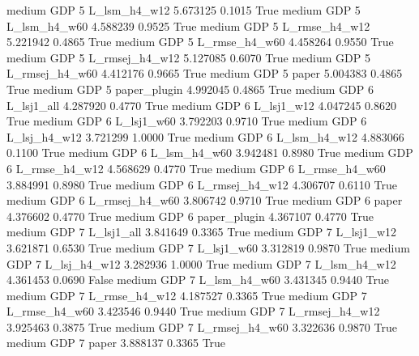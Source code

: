     medium      GDP                 5   L_lsm_h4_w12   5.673125      0.1015    True
    medium      GDP                 5   L_lsm_h4_w60   4.588239      0.9525    True
    medium      GDP                 5  L_rmse_h4_w12   5.221942      0.4865    True
    medium      GDP                 5  L_rmse_h4_w60   4.458264      0.9550    True
    medium      GDP                 5 L_rmsej_h4_w12   5.127085      0.6070    True
    medium      GDP                 5 L_rmsej_h4_w60   4.412176      0.9665    True
    medium      GDP                 5          paper   5.004383      0.4865    True
    medium      GDP                 5   paper_plugin   4.992045      0.4865    True
    medium      GDP                 6     L_lsj1_all   4.287920      0.4770    True
    medium      GDP                 6     L_lsj1_w12   4.047245      0.8620    True
    medium      GDP                 6     L_lsj1_w60   3.792203      0.9710    True
    medium      GDP                 6   L_lsj_h4_w12   3.721299      1.0000    True
    medium      GDP                 6   L_lsm_h4_w12   4.883066      0.1100    True
    medium      GDP                 6   L_lsm_h4_w60   3.942481      0.8980    True
    medium      GDP                 6  L_rmse_h4_w12   4.568629      0.4770    True
    medium      GDP                 6  L_rmse_h4_w60   3.884991      0.8980    True
    medium      GDP                 6 L_rmsej_h4_w12   4.306707      0.6110    True
    medium      GDP                 6 L_rmsej_h4_w60   3.806742      0.9710    True
    medium      GDP                 6          paper   4.376602      0.4770    True
    medium      GDP                 6   paper_plugin   4.367107      0.4770    True
    medium      GDP                 7     L_lsj1_all   3.841649      0.3365    True
    medium      GDP                 7     L_lsj1_w12   3.621871      0.6530    True
    medium      GDP                 7     L_lsj1_w60   3.312819      0.9870    True
    medium      GDP                 7   L_lsj_h4_w12   3.282936      1.0000    True
    medium      GDP                 7   L_lsm_h4_w12   4.361453      0.0690   False
    medium      GDP                 7   L_lsm_h4_w60   3.431345      0.9440    True
    medium      GDP                 7  L_rmse_h4_w12   4.187527      0.3365    True
    medium      GDP                 7  L_rmse_h4_w60   3.423546      0.9440    True
    medium      GDP                 7 L_rmsej_h4_w12   3.925463      0.3875    True
    medium      GDP                 7 L_rmsej_h4_w60   3.322636      0.9870    True
    medium      GDP                 7          paper   3.888137      0.3365    True
